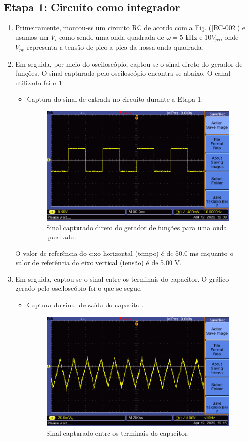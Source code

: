 \documentclass[letterpaper, 12pt]{article}
\begin{document}
\subsection{Etapa 1: Circuito como integrador}\label{Etapa 1}
\begin{enumerate}
    \item Primeiramente, montou-se um circuito RC de acordo com a Fig. (\ref{RC-002}) e usamos um $V_{i}$ como sendo uma onda quadrada de $\omega=5$ kHz e $10V_{pp}$, onde $V_{pp}$ representa a tensão de pico a pico da nossa onda quadrada. 

    \item Em seguida, por meio do osciloscópio, captou-se o sinal direto do gerador de funções. O sinal capturado pelo osciloscópio encontra-se abaixo. O canal utilizado foi o 1. \\
    \begin{itemize}
        \item Captura do sinal de entrada no circuito durante a Etapa 1:
        \begin{figure}[h]
            \centering
            \includegraphics[width=0.5\linewidth]{figures/Gerador de funções.png}
            \caption{Sinal capturado direto do gerador de funções para uma onda quadrada.}
            \label{Sinal - Gerador de funções}
        \end{figure}
    \end{itemize}
     
     O valor de referência do eixo horizontal (tempo) é de 50.0 ms enquanto o valor de referência do eixo vertical (tensão) é de 5.00 V.
     
     \item Em seguida, captou-se o sinal entre os terminais do capacitor. O gráfico gerado pelo osciloscópio foi o que se segue. \\
    \begin{itemize}
        \item Captura do sinal de saída do capacitor:
        \begin{figure}[h]
            \centering
            \includegraphics[width=0.5\linewidth]{figures/Sinal-Capacitor.png}
            \caption{Sinal capturado entre os terminais do capacitor.}
            \label{Sinal - Capacitor}
        \end{figure}
    \end{itemize}
    

\end{enumerate}
\end{document}
